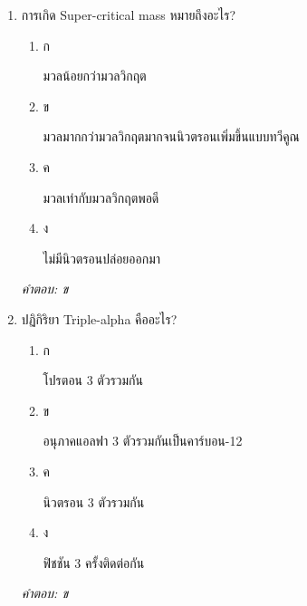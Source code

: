 \documentclass[12pt]{article}
\begin{document}
\begin{enumerate}[label=\arabic*., itemsep=0.5\baselineskip, topsep=0.5\baselineskip, leftmargin=*]
\item การเกิด Super-critical mass หมายถึงอะไร?
\begin{enumerate}[label=\alph*)., itemsep=0.3\baselineskip, topsep=0.3\baselineskip]
\item ก\ 
\begin{minipage}[t]{0.9\linewidth}
\raggedright มวลน้อยกว่ามวลวิกฤต
\end{minipage}
\item ข\ 
\begin{minipage}[t]{0.9\linewidth}
\raggedright มวลมากกว่ามวลวิกฤตมากจนนิวตรอนเพิ่มขึ้นแบบทวีคูณ
\end{minipage}
\item ค\ 
\begin{minipage}[t]{0.9\linewidth}
\raggedright มวลเท่ากับมวลวิกฤตพอดี
\end{minipage}
\item ง\ 
\begin{minipage}[t]{0.9\linewidth}
\raggedright ไม่มีนิวตรอนปล่อยออกมา
\end{minipage}
\end{enumerate}
\vspace{-0.3\baselineskip}
\begin{small}
\textit{คำตอบ: ข}
\end{small}

\item ปฏิกิริยา Triple-alpha คืออะไร?
\begin{enumerate}[label=\alph*)., itemsep=0.3\baselineskip, topsep=0.3\baselineskip]
\item ก\ 
\begin{minipage}[t]{0.9\linewidth}
\raggedright โปรตอน 3 ตัวรวมกัน
\end{minipage}
\item ข\ 
\begin{minipage}[t]{0.9\linewidth}
\raggedright อนุภาคแอลฟา 3 ตัวรวมกันเป็นคาร์บอน-12
\end{minipage}
\item ค\ 
\begin{minipage}[t]{0.9\linewidth}
\raggedright นิวตรอน 3 ตัวรวมกัน
\end{minipage}
\item ง\ 
\begin{minipage}[t]{0.9\linewidth}
\raggedright ฟิชชัน 3 ครั้งติดต่อกัน
\end{minipage}
\end{enumerate}
\vspace{-0.3\baselineskip}
\begin{small}
\textit{คำตอบ: ข}
\end{small}


\end{enumerate}
\end{document}
